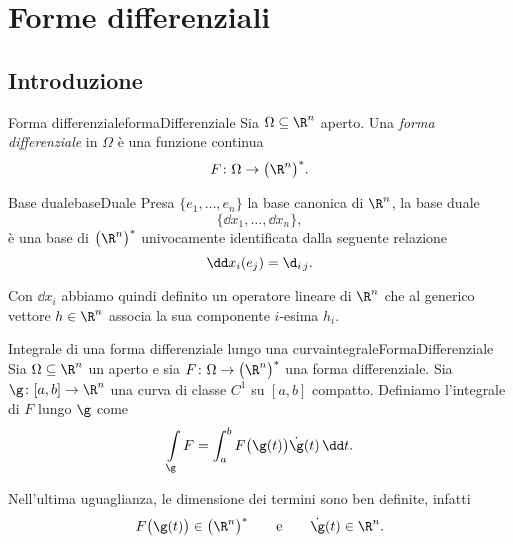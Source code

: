 %
%
\chapter{Forme differenziali}
\section{Introduzione}

\begin{defn}{Forma differenziale}{formaDifferenziale}
	Sia \(\Omega\subseteq \R^n\) aperto.
	Una \emph{forma differenziale} in \(\Omega\) è una funzione continua
	\[
		F\colon \Omega \to \big(\R^n\big)^*.
	\]
\end{defn}

\begin{defn}{Base duale}{baseDuale}
	Presa \(\{e_1,\ldots,e_n\}\) la base canonica di \(\R^n\), la base duale
	\[
		\{\dd x_1,\ldots, \dd x_n\},
	\]
	è una base di \(\big(\R^n\big)^*\) univocamente identificata dalla seguente relazione
	\[
		\dd x_i (e_j) = \d_{i\,j}.
	\]
\end{defn}

\begin{oss}
	Con \(\dd x_i\) abbiamo quindi definito un operatore lineare di \(\R^n\) che al generico vettore \(h\in\R^n\) associa la sua componente \(i\)-esima \(h_i\).
\end{oss}

\begin{defn}{Integrale di una forma differenziale lungo una curva}{integraleFormaDifferenziale}
	Sia \(\Omega\subseteq\R^n\) un aperto e sia \(F\colon \Omega \to \big(\R^n\big)^*\) una forma differenziale.
	Sia \(\g\colon [a,b]\to\R^n\) una curva di classe \(C^1\) su \([a,b]\) compatto.
	Definiamo l'integrale di \(F\) lungo \(\g\) come
	\[
		\int\limits_\g F = \int_a^b F\big(\g(t)\big) \dot{\g}(t)\,\dd t.
	\]
\end{defn}

\begin{oss}
	Nell'ultima uguaglianza, le dimensione dei termini sono ben definite, infatti
	\[
		F\big(\g(t)\big) \in \big(\R^n\big)^* \qquad\text{e}\qquad \dot{\g}(t)\in\R^n.
	\]
\end{oss}

